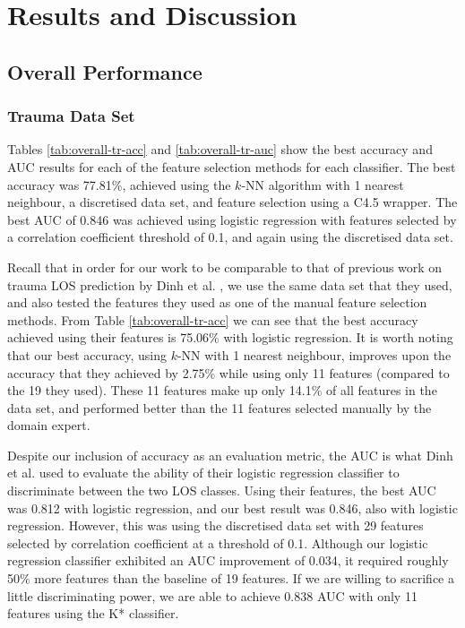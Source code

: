 \chapter{Results and Discussion} \label{chap:results}

\section{Overall Performance}
\subsection{Trauma Data Set}
Tables \ref{tab:overall-tr-acc} and \ref{tab:overall-tr-auc} show the best
accuracy and AUC results for each of the feature selection methods for each
classifier. The best accuracy was 77.81\%, achieved using the $k$-NN algorithm
with 1 nearest neighbour, a discretised data set, and feature selection using a
C4.5 wrapper. The best AUC of 0.846 was achieved using logistic regression with
features selected by a correlation coefficient threshold of 0.1, and again
using the discretised data set.




Recall that in order for our work to be comparable to that of previous work on
trauma LOS prediction by Dinh et al. \cite{Dinh2013a}, we use the same data set
that they used, and also tested the features they used as one of the manual
feature selection methods. From Table \ref{tab:overall-tr-acc} we can see that
the best accuracy achieved using their features is 75.06\% with logistic
regression. It is worth noting that our best accuracy, using $k$-NN with 1
nearest neighbour, improves upon the accuracy that they achieved by 2.75\%
while using only 11 features (compared to the 19 they used). These 11 features
make up only 14.1\% of all features in the data set, and performed better than
the 11 features selected manually by the domain expert.

Despite our inclusion of accuracy as an evaluation metric, the AUC is what Dinh
et al. used to evaluate the ability of their logistic regression classifier to
discriminate between the two LOS classes. Using their features, the best AUC
was 0.812 with logistic regression, and our best result was 0.846, also with
logistic regression. However, this was using the discretised data set with 29
features selected by correlation coefficient at a threshold of 0.1.
Although our logistic regression classifier exhibited an AUC improvement of
0.034, it required roughly 50\% more features than the baseline of 19 features.
If we are willing to sacrifice a little discriminating power, we are able to
achieve 0.838 AUC with only 11 features using the K* classifier.

